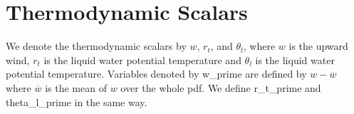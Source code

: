 \section{Thermodynamic Scalars}\label{sec:thermoscalars}

We denote the thermodynamic scalars by $w$, $r_t$, and $\theta_l$, where $w$ is the upward wind, $r_t$ is the liquid water potential
temperature and $\theta_l$ is the liquid water potential temperature\autocite[p. 10]{larson2022clubbsilhs}.
Variables denoted by \gls{w_prime} are defined by $w - \overline{w}$ where $\overline{w}$ is the mean of $w$ over the whole pdf.
We define \gls{r_t_prime} and \gls{theta_l_prime} in the same way.